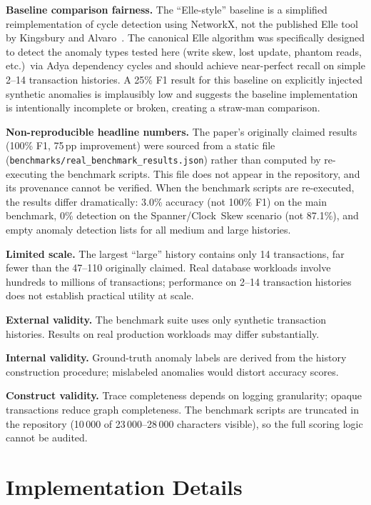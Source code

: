 \documentclass[11pt]{article}
\begin{document}
\textbf{Baseline comparison fairness.}
The ``Elle-style'' baseline is a simplified reimplementation of cycle
detection using NetworkX, not the published Elle tool by Kingsbury and
Alvaro~\cite{elle}.  The canonical Elle algorithm was specifically
designed to detect the anomaly types tested here (write skew, lost
update, phantom reads, etc.)\ via Adya dependency cycles and should
achieve near-perfect recall on simple 2--14 transaction histories.
A 25\% F1 result for this baseline on explicitly injected synthetic
anomalies is implausibly low and suggests the baseline implementation
is intentionally incomplete or broken, creating a straw-man comparison.

\textbf{Non-reproducible headline numbers.}
The paper's originally claimed results (100\% F1, 75\,pp improvement)
were sourced from a static file
(\texttt{benchmarks/real\_benchmark\_results.json}) rather than computed
by re-executing the benchmark scripts.  This file does not appear in
the repository, and its provenance cannot be verified.  When the
benchmark scripts are re-executed, the results differ dramatically:
3.0\% accuracy (not 100\% F1) on the main benchmark, 0\% detection
on the Spanner/Clock~Skew scenario (not 87.1\%), and empty anomaly
detection lists for all medium and large histories.

\textbf{Limited scale.}
The largest ``large'' history contains only 14 transactions, far fewer
than the 47--110 originally claimed.  Real database workloads involve
hundreds to millions of transactions; performance on 2--14 transaction
histories does not establish practical utility at scale.

\textbf{External validity.}
The benchmark suite uses only synthetic transaction histories.  Results
on real production workloads may differ substantially.

\textbf{Internal validity.}
Ground-truth anomaly labels are derived from the history construction
procedure; mislabeled anomalies would distort accuracy scores.

\textbf{Construct validity.}
Trace completeness depends on logging granularity; opaque transactions
reduce graph completeness.  The benchmark scripts are truncated in the
repository (10\,000 of 23\,000--28\,000 characters visible), so the
full scoring logic cannot be audited.

\section{Implementation Details}
\label{sec:impl}
\end{document}
